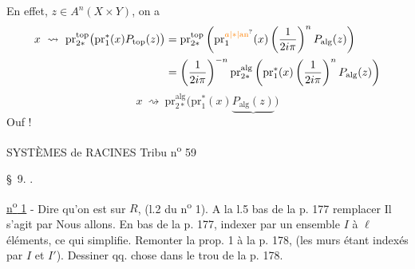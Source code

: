 En effet,  $z\in A^n(X\times Y)$, on a 
\[
\begin{aligned}
 x\ \rightsquigarrow\ \mathrm{pr}_{2*}^{\mathrm{top}}\bigl(\mathrm{pr}_1^*(x)P_{\mathrm{top}}(z)\bigr)
 &=\mathrm{pr}_{2*}^{\mathrm{top}}\left(\mathrm{pr}_1^{\unsure{a|*|\mathrm{an}}}(x)\left(\frac{1}{2i\pi}\right)^n P_{\mathrm{alg}}(z)\right)\\
 &=\left(\frac{1}{2i\pi}\right)^{-n}\mathrm{pr}_{2*}^{\mathrm{alg}}\left(\mathrm{pr}_1^*(x)\left(\frac{1}{2i\pi}\right)^n P_{\mathrm{alg}}(z)\right)
\end{aligned}
\]
\[
 x\ \rightsquigarrow\ \mathrm{pr}_{2*}^{\mathrm{alg}}\bigl(\mathrm{pr}_1^*(x)\underbrace{P_{\mathrm{alg}}(z)}\bigr)
\]
\hfill Ouf !

SYSTÈMES de RACINES \hfill Tribu n\textsuperscript{o} 59

\S~9. .

\uline{n\textsuperscript{o} 1} - Dire qu'on est sur $R$, (l.2 du n\textsuperscript{o} 1). A la l.5 bas de la p. 177 remplacer \textquotedbl{}Il s'agit\textquotedbl{} par \textquotedbl{}Nous allons\textquotedbl{}. En bas de la p. 177, indexer par un ensemble $I$ à $\ell$ éléments, ce qui simplifie. Remonter la prop. 1 à la p. 178, (les murs étant indexés par $I$ et $I'$). Dessiner qq. chose dans le trou de la p. 178.

